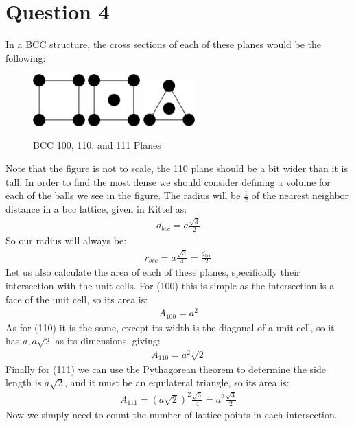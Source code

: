 \documentclass[12pt]{article}
\begin{document}
\section*{Question 4}
In a BCC structure, the cross sections of each of these planes would be the following:
\begin{figure}[H]
  \centering
  \includegraphics[width=2cm]{bcc100}\quad
  \includegraphics[width=2cm]{bcc110}\quad
  \includegraphics[width=2cm]{bcc111}
  \caption{BCC 100, 110, and 111 Planes}
  \label{fig:n}
\end{figure}
Note that the figure is not to scale, the 110 plane should be a bit wider than it is tall. In order to find the most dense we should consider defining a volume for each of the balls we see in the figure. The radius will be $\frac{1}{2}$ of the nearest neighbor distance in a bcc lattice, given in Kittel as:
\begin{align*}
  d_{bcc}=a\frac{\sqrt{3}}{2}
\end{align*}
So our radius will always be:
\begin{align*}
  r_{bcc}=a\frac{\sqrt{3}}{4}=\frac{d_{bcc}}{2}
\end{align*}
Let us also calculate the area of each of these planes, specifically their intersection with the unit cells. For (100) this is simple as the intersection is a face of the unit cell, so its area is:
\begin{align*}
  A_{100}=a^2
\end{align*}
As for (110) it is the same, except its width is the diagonal of a unit cell, so it has $a,a\sqrt{2}$ as its dimensions, giving:
\begin{align*}
  A_{110}=a^2\sqrt{2}
\end{align*}
Finally for (111) we can use the Pythagorean theorem to determine the side length is $a\sqrt{2}$, and it must be an equilateral triangle, so its area is:
\begin{align*}
  A_{111}=(a\sqrt{2})^2\frac{\sqrt{3}}{4}=a^2\frac{\sqrt{3}}{2}
\end{align*}
Now we simply need to count the number of lattice points in each intersection.
\end{document}
